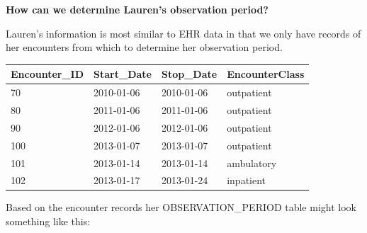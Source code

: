 \documentclass[11pt]{book}
\begin{document}
\textbf{How can we determine Lauren's observation period?}

Lauren's information is most similar to EHR data in that we only have
records of her encounters from which to determine her observation
period.

\begin{longtable}[]{@{}llll@{}}
\toprule
Encounter\_ID & Start\_Date & Stop\_Date & EncounterClass\tabularnewline
\midrule
\endhead
70 & 2010-01-06 & 2010-01-06 & outpatient\tabularnewline
80 & 2011-01-06 & 2011-01-06 & outpatient\tabularnewline
90 & 2012-01-06 & 2012-01-06 & outpatient\tabularnewline
100 & 2013-01-07 & 2013-01-07 & outpatient\tabularnewline
101 & 2013-01-14 & 2013-01-14 & ambulatory\tabularnewline
102 & 2013-01-17 & 2013-01-24 & inpatient\tabularnewline
\bottomrule
\end{longtable}

Based on the encounter records her OBSERVATION\_PERIOD table might look
something like this:
\end{document}

